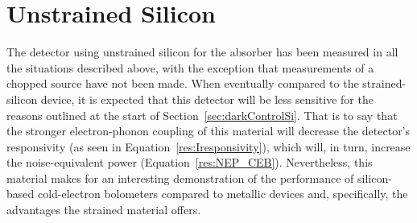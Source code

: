 \section{Unstrained Silicon}\label{sec:opticalControlSi}
The detector using unstrained silicon for the absorber has been measured in all the situations described above, with the exception that measurements of a chopped source have not been made. When eventually compared to the strained-silicon device, it is expected that this detector will be less sensitive for the reasons outlined at the start of Section~\ref{sec:darkControlSi}. That is to say that the stronger electron-phonon coupling of this material will decrease the detector's responsivity (as seen in Equation~\ref{res:Iresponsivity}), which will, in turn, increase the noise-equivalent power (Equation~\ref{res:NEP_CEB}). Nevertheless, this material makes for an interesting demonstration of the performance of silicon-based cold-electron bolometers compared to metallic devices and, specifically, the advantages the strained material offers.
%
